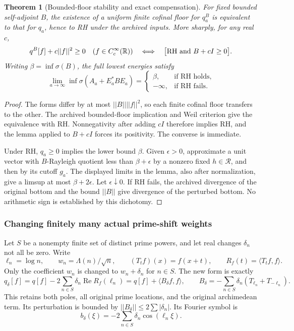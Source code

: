\documentclass[11pt]{article}
\def\norm#1{||#1||}%
\newtheorem{theorem}{Theorem}[section]
\theoremstyle{remark}
\newcommand{\norm}[1]{\left\lVert #1\right\rVert}
\begin{document}
\begin{theorem}[Bounded-floor stability and exact compensation]\label{thm:ns57-bounded-floor-stability}
For fixed bounded self-adjoint $B$, the existence of a uniform finite
cofinal floor for $q_a^B$ is equivalent to that for $q_a$, hence to RH
under the archived inputs. More sharply, for any real $c$,
\[
 q^B[f]+c\norm f^2\ge0\quad(f\in C_c^\infty(\mathbb R))
 \quad\Longleftrightarrow\quad
 \bigl[\mathrm{RH}\ \hbox{and}\ B+cI\ge0\bigr].
\]
Writing $\beta=\inf\sigma(B)$, the full lowest energies satisfy
\[
 \lim_{a\to\infty}\inf\sigma(A_a+E_a^*BE_a)
 =\begin{cases}\beta,&\text{if RH holds},\\-\infty,&\text{if RH fails}.
 \end{cases}
\]
\end{theorem}
\begin{proof}
The forms differ by at most $\norm B\norm f^2$, so each finite
cofinal floor transfers to the other. The archived bounded-floor
implication and Weil criterion give the equivalence with RH.
Nonnegativity after adding $cI$ therefore implies RH, and the lemma
applied to $B+cI$ forces its positivity. The converse is immediate.

Under RH, $q_a\ge0$ implies the lower bound $\beta$. Given
$\epsilon>0$, approximate a unit vector with $B$-Rayleigh quotient
less than $\beta+\epsilon$ by a nonzero fixed $h\in\mathcal R$,
and then by its cutoff $g_a$. The displayed limits in the lemma,
also after normalization, give a limsup at most $\beta+2\epsilon$.
Let $\epsilon\downarrow0$. If RH fails, the archived divergence
of the original bottom and the bound $\norm B$ give divergence
of the perturbed bottom. No arithmetic sign is established by this dichotomy.
\end{proof}

\subsubsection{Changing finitely many actual prime-shift weights}
Let $S$ be a nonempty finite set of distinct prime powers, and let
real changes $\delta_n$ not all be zero. Write
\[
 \ell_n=\log n,\qquad w_n=\Lambda(n)/\sqrt n,\qquad
 (T_tf)(x)=f(x+t),\qquad R_f(t)=\langle T_tf,f\rangle.
\]
Only the coefficient $w_n$ is changed to $w_n+\delta_n$ for $n\in S$.
The new form is exactly
\[
 q_\delta[f]=q[f]-2\sum_{n\in S}\delta_n\operatorname{Re}R_f(\ell_n)
            =q[f]+\langle B_\delta f,f\rangle,
 \qquad B_\delta=-\sum_{n\in S}\delta_n(T_{\ell_n}+T_{-\ell_n}).
\]
This retains both poles, all original prime locations, and the original
archimedean term. Its perturbation is bounded by
$\norm{B_\delta}\le2\sum|\delta_n|$. Its Fourier symbol is
\[
 b_\delta(\xi)=-2\sum_{n\in S}\delta_n\cos(\ell_n\xi).
\]
\end{document}
